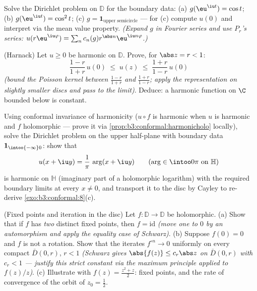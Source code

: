 \begin{exercise}[$\star\star$]\label{exo:b3:conformal:8}
Solve the Dirichlet problem on $\mathbb D$ for the boundary
data: (a) $g(\eu^{\iu t}) = \cos t$; (b) $g(\eu^{\iu t}) =
\cos^2 t$; (c) $g = \mathbf 1_{\text{upper semicircle}}$ ---
for (c) compute $u(0)$ and interpret via the mean value
property. \emph{(Expand $g$ in Fourier series and use
$P_r$'s series: $u(r\eu^{\iu\varphi}) = \sum_n c_n(g)
r^{\abs n}\eu^{\iu n\varphi}$.)}
\end{exercise}

\begin{exercise}[$\star\star\star$]\label{exo:b3:conformal:9}
(Harnack) Let $u \geq 0$ be harmonic on $\mathbb D$. Prove,
for $\abs z = r < 1$:
\[
\frac{1 - r}{1 + r}\,u(0) \;\leq\; u(z) \;\leq\;
\frac{1 + r}{1 - r}\,u(0)
\]
\emph{(bound the Poisson kernel between $\frac{1-r}{1+r}$ and
$\frac{1+r}{1-r}$; apply the representation on slightly
smaller discs and pass to the limit)}. Deduce: a harmonic
function on $\C$ bounded below is constant.
\end{exercise}

\begin{exercise}[$\star\star$]\label{exo:b3:conformal:10}
Using conformal invariance of harmonicity ($u\circ f$ is
harmonic when $u$ is harmonic and $f$ holomorphic --- prove
it via \cref{prop:b3:conformal:harmonicholo} locally), solve
the Dirichlet problem on the upper half-plane with boundary
data $\mathbf 1_{\intoo{-\infty}0}$: show that
\[
u(x + \iu y) = \frac1\pi\,\arg(x + \iu y)
\qquad (\arg \in \intoo0\pi \text{ on } \mathbb H)
\]
is harmonic on $\mathbb H$ (imaginary part of a holomorphic
logarithm) with the required boundary limits at every $x \neq
0$, and transport it to the disc by Cayley to re-derive
\cref{exo:b3:conformal:8}(c).
\end{exercise}

\begin{exercise}[$\star\star$]\label{exo:b3:conformal:11}
(Fixed points and iteration in the disc) Let $f\colon\mathbb
D \to \mathbb D$ be holomorphic.
(a) Show that if $f$ has \emph{two} distinct fixed points,
then $f = \mathrm{id}$ \emph{(move one to $0$ by an
automorphism and apply the equality case of Schwarz)}.
(b) Suppose $f(0) = 0$ and $f$ is not a rotation. Show that
the iterates $f^{\circ n} \to 0$ uniformly on every compact
$\bar D(0, r)$, $r < 1$ \emph{(Schwarz gives $\abs{f(z)}
\leq c_r\abs z$ on $\bar D(0,r)$ with $c_r < 1$ --- justify
this strict constant via the maximum principle applied to
$f(z)/z$)}.
(c) Illustrate with $f(z) = \frac{z^2 + z}2$: fixed points,
and the rate of convergence of the orbit of $z_0 =
\frac12$.
\end{exercise}

